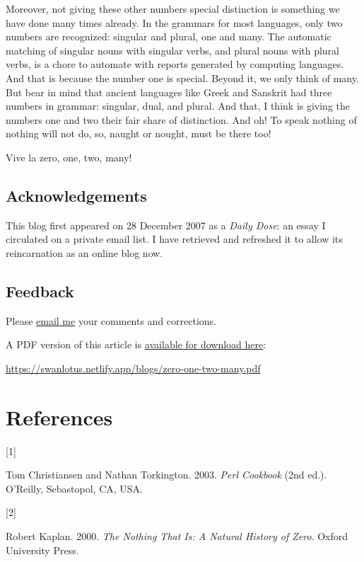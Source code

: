 \documentclass[
  a4paper,
]{article}
\newlength{\cslhangindent}
\newlength{\csllabelwidth}
\newlength{\cslentryspacingunit} %
\newenvironment{CSLReferences}[2] %
 {%
  \setlength{\parindent}{0pt}
  \ifodd #1
  \let\oldpar\par
  \def\par{\hangindent=\cslhangindent\oldpar}
  \fi
  \setlength{\parskip}{#2\cslentryspacingunit}
 }%
 {}
\newcommand{\CSLLeftMargin}[1]{\parbox[t]{\csllabelwidth}{#1}}
\newcommand{\CSLRightInline}[1]{\parbox[t]{\linewidth - \csllabelwidth}{#1}\break}
\begin{document}
Moreover, not giving these other numbers special distinction is
something we have done many times already. In the grammars for most
languages, only two numbers are recognized: singular and plural, one and
many. The automatic matching of singular nouns with singular verbs, and
plural nouns with plural verbs, is a chore to automate with reports
generated by computing languages. And that is because the number one is
special. Beyond it, we only think of many. But bear in mind that ancient
languages like Greek and Sanskrit had three numbers in grammar:
singular, dual, and plural. And that, I think is giving the numbers one
and two their fair share of distinction. And oh! To speak nothing of
nothing will not do, so, naught or nought, must be there too!

Vive la zero, one, two, many!

\hypertarget{acknowledgements}{%
\subsection{Acknowledgements}\label{acknowledgements}}

This blog first appeared on 28 December 2007 as a \emph{Daily Dose}: an
essay I circulated on a private email list. I have retrieved and
refreshed it to allow its reincarnation as an online blog now.

\hypertarget{feedback}{%
\subsection{Feedback}\label{feedback}}

Please \href{mailto:feedback.swanlotus@gmail.com}{email me} your
comments and corrections.

\noindent A PDF version of this article is
\href{./zero-one-two-many.pdf}{available for download here}:

\begin{small}

\begin{sffamily}

\url{https://swanlotus.netlify.app/blogs/zero-one-two-many.pdf}

\end{sffamily}

\end{small}

\hypertarget{bibliography}{%
\section*{References}\label{bibliography}}

\hypertarget{refs}{}
\begin{CSLReferences}{0}{0}
\leavevmode{}%
\CSLLeftMargin{{[}1{]} }%
\CSLRightInline{Tom Christiansen and Nathan Torkington. 2003.
\emph{{Perl Cookbook}} (2nd ed.). O'Reilly, Sebastopol, CA, USA.}

\leavevmode{}%
\CSLLeftMargin{{[}2{]} }%
\CSLRightInline{Robert Kaplan. 2000. \emph{{The Nothing That Is: A
Natural History of Zero}}. Oxford University Press.}

\end{CSLReferences}
\end{document}
